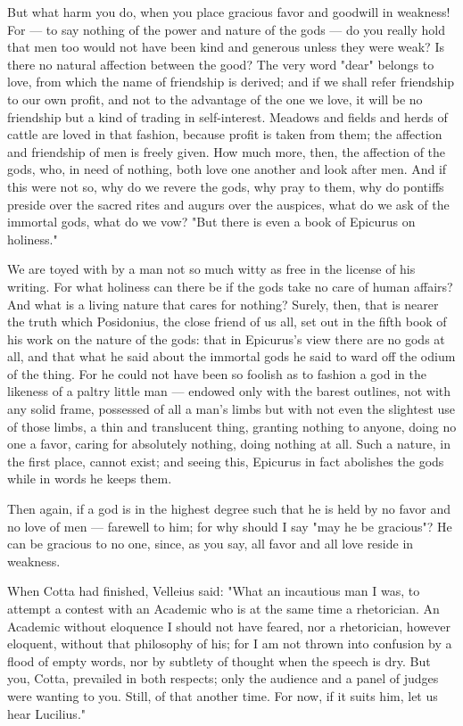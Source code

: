  But what harm you do, when you place gracious favor and goodwill in weakness! For — to say nothing of the power and nature of the gods — do you really hold that men too would not have been kind and generous unless they were weak? Is there no natural affection between the good? The very word "dear" belongs to love, from which the name of friendship is derived; and if we shall refer friendship to our own profit, and not to the advantage of the one we love, it will be no friendship but a kind of trading in self-interest. Meadows and fields and herds of cattle are loved in that fashion, because profit is taken from them; the affection and friendship of men is freely given. How much more, then, the affection of the gods, who, in need of nothing, both love one another and look after men. And if this were not so, why do we revere the gods, why pray to them, why do pontiffs preside over the sacred rites and augurs over the auspices, what do we ask of the immortal gods, what do we vow? "But there is even a book of Epicurus on holiness."

 We are toyed with by a man not so much witty as free in the license of his writing. For what holiness can there be if the gods take no care of human affairs? And what is a living nature that cares for nothing? Surely, then, that is nearer the truth which Posidonius, the close friend of us all, set out in the fifth book of his work on the nature of the gods: that in Epicurus's view there are no gods at all, and that what he said about the immortal gods he said to ward off the odium of the thing. For he could not have been so foolish as to fashion a god in the likeness of a paltry little man — endowed only with the barest outlines, not with any solid frame, possessed of all a man's limbs but with not even the slightest use of those limbs, a thin and translucent thing, granting nothing to anyone, doing no one a favor, caring for absolutely nothing, doing nothing at all. Such a nature, in the first place, cannot exist; and seeing this, Epicurus in fact abolishes the gods while in words he keeps them.

 Then again, if a god is in the highest degree such that he is held by no favor and no love of men — farewell to him; for why should I say "may he be gracious"? He can be gracious to no one, since, as you say, all favor and all love reside in weakness.


 When Cotta had finished, Velleius said: "What an incautious man I was, to attempt a contest with an Academic who is at the same time a rhetorician. An Academic without eloquence I should not have feared, nor a rhetorician, however eloquent, without that philosophy of his; for I am not thrown into confusion by a flood of empty words, nor by subtlety of thought when the speech is dry. But you, Cotta, prevailed in both respects; only the audience and a panel of judges were wanting to you. Still, of that another time. For now, if it suits him, let us hear Lucilius."

